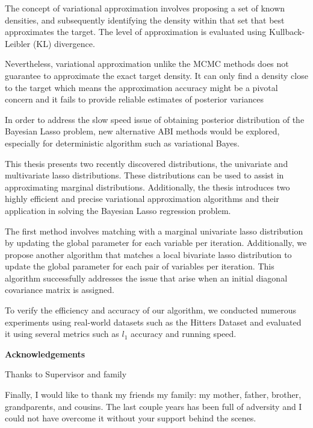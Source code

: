 The concept of variational approximation involves proposing a set of known densities, and subsequently identifying the density within that set that best approximates the target. The level of approximation is evaluated using Kullback-Leibler (KL) divergence.

Nevertheless, variational approximation unlike the MCMC methods does not guarantee to approximate the exact target density. It can only find a density close to the target which means the approximation accuracy might  be a pivotal concern and it fails to provide reliable estimates of posterior variances

In order to address the slow speed issue of obtaining posterior distribution of the Bayesian Lasso problem, new alternative ABI methods would be explored, especially for deterministic algorithm such as variational Bayes.

This thesis presents two recently discovered distributions, the univariate and multivariate lasso distributions. These distributions can be used to assist in approximating marginal distributions. Additionally, the thesis introduces two highly efficient and precise variational approximation algorithms and their application in solving the Bayesian Lasso regression problem.


The first method involves matching with a marginal univariate lasso distribution by updating the global parameter for each variable per iteration. Additionally, we propose another algorithm that matches a local bivariate lasso distribution to update the global parameter for each pair of variables per iteration. This algorithm successfully addresses the issue that arise when an initial diagonal covariance matrix is assigned.

To verify the efficiency and accuracy of our algorithm, we conducted numerous experiments using real-world datasets such as the Hitters Dataset and evaluated it using several metrics such as $l_1$ accuracy and running speed.


\newpage

\begin{center}
    \textbf{\large Acknowledgements}\\
    \vspace{0.5cm}
\end{center}
   Thanks to Supervisor and family 

   Finally, I would like to thank my friends  my family: my mother, father, brother, grandparents, and cousins. The last couple years has been full of adversity and I could not have overcome it without your support behind the scenes.
   
\vfill
\hspace{0pt}
\pagebreak
\newpage